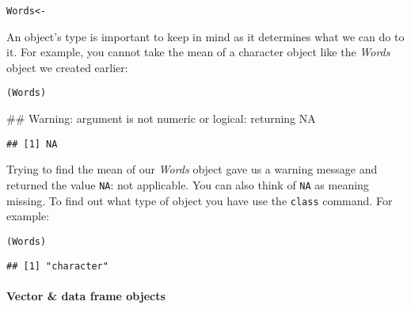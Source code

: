 \begin{knitrout}
\color{fgcolor}\begin{kframe}
\begin{alltt}
Words <- 
\end{alltt}
\end{kframe}
\end{knitrout}



An object's type is important to keep in mind as it determines what we can do to it. For example, you cannot take the mean of a character object like the {\emph{Words}} object we created earlier:

\begin{knitrout}
\color{fgcolor}\begin{kframe}
\begin{alltt}
(Words)
\end{alltt}


{\ttfamily\noindent\textcolor{warningcolor}{\#\# Warning: argument is not numeric or logical: returning NA}}\begin{verbatim}
## [1] NA
\end{verbatim}
\end{kframe}
\end{knitrout}


\noindent Trying to find the mean of our {\emph{Words}} object gave us a warning message and returned the value {\tt{NA}}: not applicable. You can also think of {\tt{NA}} as meaning missing. To find out what type of object you have use the {\tt{class}} command. For example:

\begin{knitrout}
\color{fgcolor}\begin{kframe}
\begin{alltt}
(Words)
\end{alltt}
\begin{verbatim}
## [1] "character"
\end{verbatim}
\end{kframe}
\end{knitrout}


\paragraph{Vector \& data frame objects}


